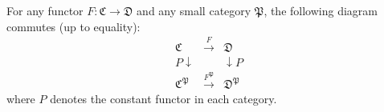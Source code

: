 For any functor $F: \mathfrak{C} \to \mathfrak{D}$ and any small category $\mathfrak{P}$, the following diagram commutes (up to equality):
$$\begin{array}{ccc}
\mathfrak{C} & \xrightarrow{F} & \mathfrak{D} \\
{\scriptstyle P}\downarrow & & \downarrow{\scriptstyle P} \\
\mathfrak{C}^{\mathfrak{P}} & \xrightarrow{F^{\mathfrak{P}}} & \mathfrak{D}^{\mathfrak{P}}
\end{array}$$
where $P$ denotes the constant functor in each category.
